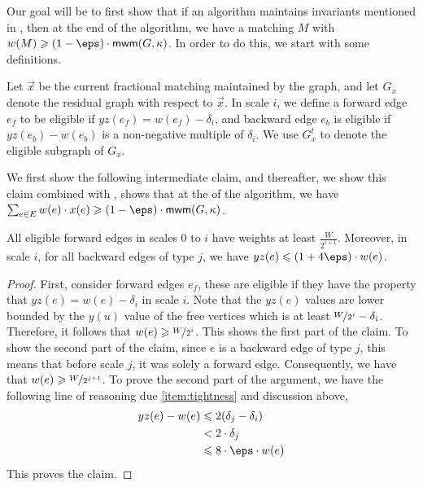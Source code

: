 Our goal will be to first show that if an algorithm maintains invariants mentioned in , then at the end of the algorithm, we have a matching $M$ with $w(M)\geqslant (1-\eps)\cdot \textsf{mwm}(G,\kappa)$. In order to do this, we start with some definitions.

\begin{definition2}
Let $\vec{x}$ be the current fractional matching maintained by the graph, and let $G_x$ denote the residual graph with respect to $\vec{x}$. In scale $i$, we define a forward edge $e_f$ to be eligible if $yz(e_f)=w(e_f)-\delta_i$, and backward edge $e_b$ is eligible if $yz(e_b)-w(e_b)$ is a non-negative multiple of $\delta_i$. We use $G^t_{x}$ to denote the eligible subgraph of $G_x$. 
\end{definition2}
We first show the following intermediate claim, and thereafter, we show this claim combined with , shows that at the of the algorithm, we have $\sum_{e\in E} w(e)\cdot x(e)\geqslant (1-\eps)\cdot \textsf{mwm}(G,\kappa)$. 

\begin{claim2}\label{claim:forward}
All eligible forward edges in scales $0$ to $i$ have weights at least $\frac{W}{2^{i+1}}$. Moreover, in scale $i$, for all backward edges of type $j$, we have $yz(e)\leqslant (1+4\eps)\cdot w(e)$.
\end{claim2}
\begin{proof}
First, consider forward edges $e_f$, these are eligible if they have the property that $yz(e)=w(e)-\delta_i$ in scale $i$. Note that the $yz(e)$ values are lower bounded by the $y(u)$ value of the free vertices which is at least $\nicefrac{W}{2^i}-\delta_i$. Therefore, it follows that $w(e)\geqslant \nicefrac{W}{2^i}$. This shows the first part of the claim. To show the second part of the claim, since $e$ is a backward edge of type $j$, this means that before scale $j$, it was solely a forward edge. Consequently, we have that $w(e)\geqslant \nicefrac{W}{2^{j+1}}$. To prove the second part of the argument, we have the following line of reasoning due \ref{item:tightness} and discussion above, 
\begin{align*}
yz(e)-w(e)&\leqslant 2(\delta_j-\delta_i)\\
&< 2\cdot \delta_j\\
&\leqslant 8\cdot\eps\cdot w(e)
\end{align*}
This proves the claim.
\end{proof}

